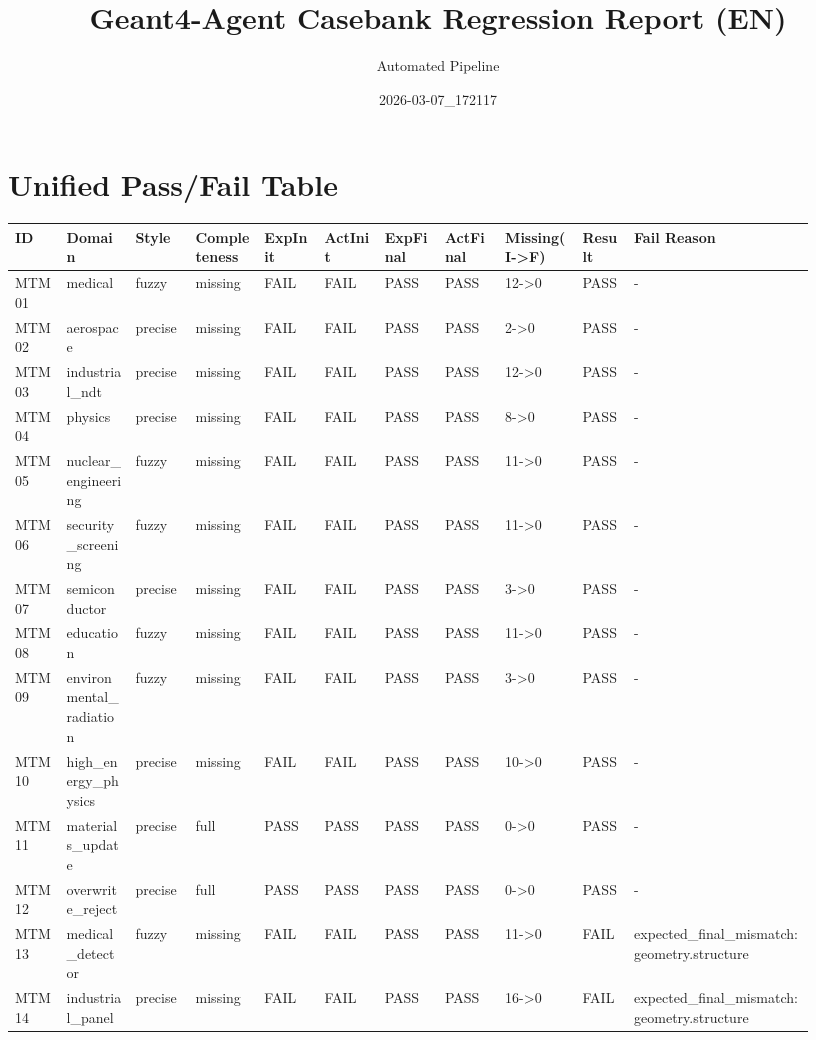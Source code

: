 \documentclass[11pt]{ctexart}
\title{Geant4-Agent Casebank Regression Report (EN)}
\author{Automated Pipeline}
\date{2026-03-07\_172117}
\begin{document}
\maketitle
\section{Unified Pass/Fail Table}
\begin{longtable}{p{0.06\linewidth}p{0.08\linewidth}p{0.07\linewidth}p{0.08\linewidth}p{0.07\linewidth}p{0.07\linewidth}p{0.07\linewidth}p{0.07\linewidth}p{0.09\linewidth}p{0.06\linewidth}p{0.21\linewidth}}
\toprule
ID & Domain & Style & Completeness & ExpInit & ActInit & ExpFinal & ActFinal & Missing(I->F) & Result & Fail Reason \\
\midrule
MTM01 & medical & fuzzy & missing & FAIL & FAIL & PASS & PASS & 12->0 & PASS & - \\
MTM02 & aerospace & precise & missing & FAIL & FAIL & PASS & PASS & 2->0 & PASS & - \\
MTM03 & industrial\_ndt & precise & missing & FAIL & FAIL & PASS & PASS & 12->0 & PASS & - \\
MTM04 & physics & precise & missing & FAIL & FAIL & PASS & PASS & 8->0 & PASS & - \\
MTM05 & nuclear\_engineering & fuzzy & missing & FAIL & FAIL & PASS & PASS & 11->0 & PASS & - \\
MTM06 & security\_screening & fuzzy & missing & FAIL & FAIL & PASS & PASS & 11->0 & PASS & - \\
MTM07 & semiconductor & precise & missing & FAIL & FAIL & PASS & PASS & 3->0 & PASS & - \\
MTM08 & education & fuzzy & missing & FAIL & FAIL & PASS & PASS & 11->0 & PASS & - \\
MTM09 & environmental\_radiation & fuzzy & missing & FAIL & FAIL & PASS & PASS & 3->0 & PASS & - \\
MTM10 & high\_energy\_physics & precise & missing & FAIL & FAIL & PASS & PASS & 10->0 & PASS & - \\
MTM11 & materials\_update & precise & full & PASS & PASS & PASS & PASS & 0->0 & PASS & - \\
MTM12 & overwrite\_reject & precise & full & PASS & PASS & PASS & PASS & 0->0 & PASS & - \\
MTM13 & medical\_detector & fuzzy & missing & FAIL & FAIL & PASS & PASS & 11->0 & FAIL & expected\_final\_mismatch:geometry.structure \\
MTM14 & industrial\_panel & precise & missing & FAIL & FAIL & PASS & PASS & 16->0 & FAIL & expected\_final\_mismatch:geometry.structure \\

\end{longtable}
\end{document}
